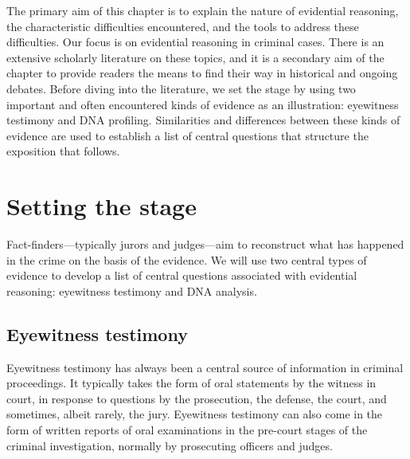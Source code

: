 \documentclass[10pt]{article}
\begin{document}
The primary aim of this chapter is to explain the nature of evidential reasoning, the characteristic difficulties encountered, and the tools to address these difficulties. Our focus is on evidential reasoning in criminal cases. There is an extensive scholarly literature on these topics, and it is a secondary aim of the chapter to provide readers the means to find their way in historical and ongoing debates. Before diving into the literature, we set the stage by using two important and often encountered kinds of evidence as an illustration: eyewitness testimony and DNA profiling. Similarities and differences between these kinds of evidence are used to establish a list of central questions that structure the exposition that follows.


\section{Setting the stage}


Fact-finders---typically jurors and judges---aim to reconstruct what has happened in the crime on the basis of the evidence. 
We will use two central types of evidence to develop a list of central questions associated with evidential reasoning: eyewitness testimony and DNA analysis.

\subsection{Eyewitness testimony}

Eyewitness testimony has always been a central source of information in criminal proceedings. It typically takes the form of oral statements by the witness in court, in response to questions by the prosecution, the defense, the court, and sometimes, albeit rarely, the jury. Eyewitness testimony can also come 
in the form of written reports of oral examinations in the pre-court stages of the criminal investigation, normally by prosecuting officers and judges. 
\end{document}
